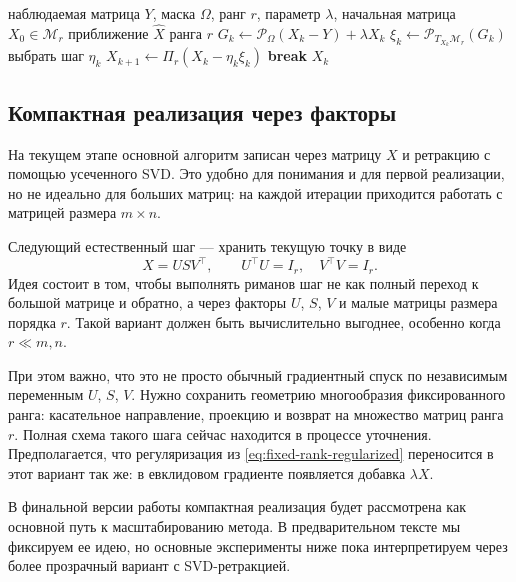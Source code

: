 \documentclass[a4paper,12pt]{article}
\renewcommand{\Proj}{\mathcal{P}}
\newcommand{\Mcal}{\mathcal{M}}
\begin{document}
\begin{algorithm}[H]
\caption{Риманов градиентный спуск на $\Mcal_r$}
\label{alg:rgd-final}
\begin{algorithmic}[1]
\Require наблюдаемая матрица $Y$, маска $\Omega$, ранг $r$, параметр $\lambda$, начальная матрица $X_0\in\Mcal_r$
\Ensure приближение $\widehat X$ ранга $r$
    \State $G_k \gets \Proj_\Omega(X_k-Y)+\lambda X_k$
    \State $\xi_k \gets \Proj_{T_{X_k}\Mcal_r}(G_k)$
    \State выбрать шаг $\eta_k$
    \State $X_{k+1}\gets \Pi_r(X_k-\eta_k\xi_k)$
        \State \textbf{break}
    \EndIf
\EndFor
\State \Return $X_k$
\end{algorithmic}
\end{algorithm}

\subsection{Компактная реализация через факторы}

На текущем этапе основной алгоритм записан через матрицу $X$ и ретракцию с помощью усеченного SVD. Это удобно для понимания и для первой реализации, но не идеально для больших матриц: на каждой итерации приходится работать с матрицей размера $m\times n$.

Следующий естественный шаг --- хранить текущую точку в виде
\[
X=USV^\top,
\qquad
U^\top U=I_r,\quad V^\top V=I_r.
\]
Идея состоит в том, чтобы выполнять риманов шаг не как полный переход к большой матрице и обратно, а через факторы $U$, $S$, $V$ и малые матрицы размера порядка $r$. Такой вариант должен быть вычислительно выгоднее, особенно когда $r\ll m,n$.

При этом важно, что это не просто обычный градиентный спуск по независимым переменным $U$, $S$, $V$. Нужно сохранить геометрию многообразия фиксированного ранга: касательное направление, проекцию и возврат на множество матриц ранга $r$. Полная схема такого шага сейчас находится в процессе уточнения. Предполагается, что регуляризация из \eqref{eq:fixed-rank-regularized} переносится в этот вариант так же: в евклидовом градиенте появляется добавка $\lambda X$.

В финальной версии работы компактная реализация будет рассмотрена как основной путь к масштабированию метода. В предварительном тексте мы фиксируем ее идею, но основные эксперименты ниже пока интерпретируем через более прозрачный вариант с SVD-ретракцией.

\newpage
\end{document}
